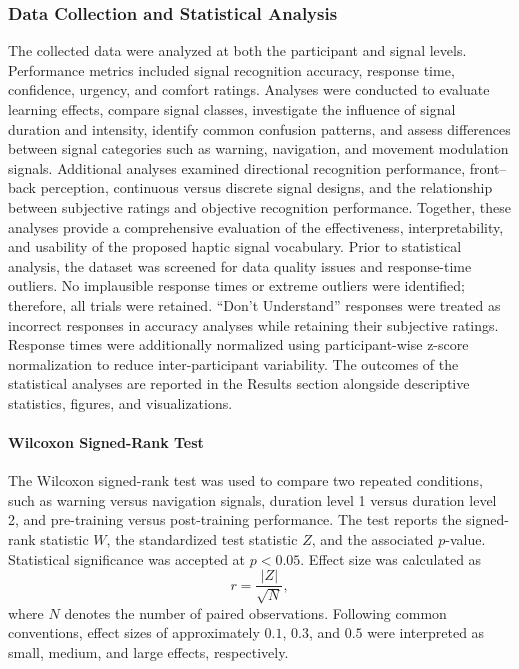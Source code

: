 \documentclass[12pt]{report}
\begin{document}
\subsubsection{Data Collection and Statistical Analysis}

The collected data were analyzed at both the participant and signal levels. Performance metrics included signal recognition accuracy, response time, confidence, urgency, and comfort ratings. Analyses were conducted to evaluate learning effects, compare signal classes, investigate the influence of signal duration and intensity, identify common confusion patterns, and assess differences between signal categories such as warning, navigation, and movement modulation signals. Additional analyses examined directional recognition performance, front--back perception, continuous versus discrete signal designs, and the relationship between subjective ratings and objective recognition performance. Together, these analyses provide a comprehensive evaluation of the effectiveness, interpretability, and usability of the proposed haptic signal vocabulary. Prior to statistical analysis, the dataset was screened for data quality issues and response-time outliers. No implausible response times or extreme outliers were identified; therefore, all trials were retained. ``Don't Understand'' responses were treated as incorrect responses in accuracy analyses while retaining their subjective ratings. Response times were additionally normalized using participant-wise z-score normalization to reduce inter-participant variability. The outcomes of the statistical analyses are reported in the Results section alongside descriptive statistics, figures, and visualizations.

\paragraph{Wilcoxon Signed-Rank Test}
The Wilcoxon signed-rank test was used to compare two repeated conditions, such as warning versus navigation signals, duration level 1 versus duration level 2, and pre-training versus post-training performance. The test reports the signed-rank statistic $W$, the standardized test statistic $Z$, and the associated $p$-value. Statistical significance was accepted at $p < 0.05$. Effect size was calculated as
\[
r = \frac{|Z|}{\sqrt{N}},
\]
where $N$ denotes the number of paired observations. Following common conventions, effect sizes of approximately $0.1$, $0.3$, and $0.5$ were interpreted as small, medium, and large effects, respectively.
\end{document}
